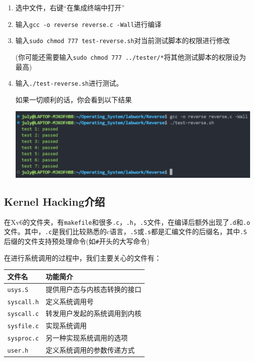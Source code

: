 \documentclass[
]{article}
\begin{document}
\begin{enumerate}
	\def\labelenumi{\arabic{enumi}.}
	\item
	      选中文件，右键``在集成终端中打开''
	\item
	      输入\texttt{gcc\ -o\ reverse\ reverse.c\ -Wall}进行编译
	\item
	      输入\texttt{sudo\ chmod\ 777\ test-reverse.sh}对当前测试脚本的权限进行修改

	      (你可能还需要输入\texttt{sudo\ chmod\ 777\ ../tester/*}将其他测试脚本的权限设为最高)
	\item
	      输入\texttt{./test-reverse.sh}进行测试。

	      如果一切顺利的话，你会看到以下结果

	      \includegraphics{./README.assets/XQ1hLsDiR2Pnrwz.png}
\end{enumerate}

\subsection{Kernel Hacking介绍}\label{kernel-hackingux4ecbux7ecd}

在Xv6的文件夹，有\texttt{makefile}和很多\texttt{.c}，\texttt{.h}，\texttt{.S}文件，在编译后额外出现了\texttt{.d}和\texttt{.o}文件。其中，\texttt{.c}是我们比较熟悉的c语言，\texttt{.S}或\texttt{.s}都是汇编文件的后缀名，其中\texttt{.S}后缀的文件支持预处理命令(如\texttt{\#}开头的大写命令)

在进行系统调用的过程中，我们主要关心的文件有：

\begin{longtable}[]{@{}ll@{}}
	\toprule\noalign{}
	文件名                & 功能简介           \\
	\midrule\noalign{}
	\endhead
	\bottomrule\noalign{}
	\endlastfoot
	\texttt{usys.S}    & 提供用户态与内核态转换的接口 \\
	\texttt{syscall.h} & 定义系统调用号        \\
	\texttt{syscall.c} & 转发用户发起的系统调用到内核 \\
	\texttt{sysfile.c} & 实现系统调用         \\
	\texttt{sysproc.c} & 另一种实现系统调用的选项   \\
	\texttt{user.h}    & 定义系统调用的参数传递方式  \\
\end{longtable}
\end{document}
